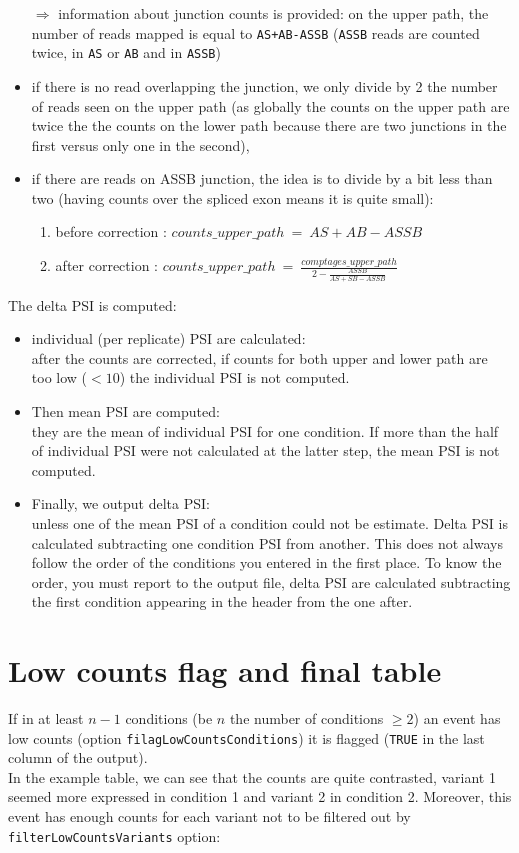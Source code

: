 \documentclass[a4paper,10pt]{article}
\begin{document}
\begin{itemize}
 $\Rightarrow$ information about junction counts is provided: on the upper path, the number of reads mapped is equal to \texttt{AS+AB-ASSB} (\texttt{ASSB} reads are counted twice, in \texttt{AS} or \texttt{AB} and in \texttt{ASSB})
  \item if there is no read overlapping the junction, we only divide by 2 the number of reads seen on the upper path (as globally the counts on the upper path are twice the the counts on the lower path because there are two junctions in the first versus only one in the second), 
  \item if there are reads on ASSB junction, the idea is to divide by a bit less than two (having counts over the spliced exon means it is quite small):
  \begin{enumerate}
    \item before correction : $counts\_upper\_path \:=\: AS+AB-ASSB $
    \item after correction : $counts\_upper\_path\:=\:\frac{comptages\_upper\_path}{2-\frac{ASSB}{AS+SB-ASSB}}$
  \end{enumerate}
 \end{itemize}
 
The delta PSI is computed:
 \begin{itemize}
\item individual (per replicate) PSI are calculated:\\
after the counts are corrected, if counts for both upper and lower path are too low ($<10$) the individual PSI is not computed.
\item Then mean PSI are computed:\\
they are the mean of individual PSI for one condition. If more than the half of individual PSI were not calculated at the latter step, the mean PSI is not computed.
\item Finally, we output delta PSI:\\
unless one of the mean PSI of a condition could not be estimate. Delta PSI is calculated subtracting one condition PSI from another. This does not always follow the order of the conditions you entered in the first place. To know the order, you must report to the output file, delta PSI are calculated subtracting the first condition appearing in the header from the one after.
\end{itemize}


\section{Low counts flag and final table}
If in at least $n-1$ conditions (be $n$ the number of conditions $\geq 2$) an event has low counts (option \texttt{filagLowCountsConditions}) it is flagged (\texttt{TRUE} in the last column of the output).\\
In the example table, we can see that the counts are quite contrasted, variant 1 seemed more expressed in condition 1 and variant 2 in condition 2. Moreover, this event has enough counts for each variant not to be filtered out by \texttt{filterLowCountsVariants} option:\\
\end{document}

